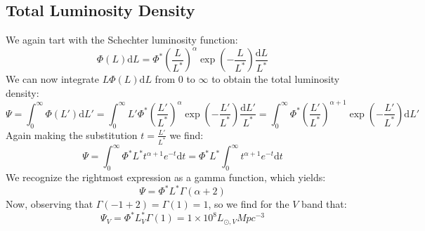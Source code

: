 \subsection{Total Luminosity Density}
We again tart with the Schechter luminosity function:
\begin{equation}
    \Phi(L) \mathrm d L = \Phi^*\left(\frac{L}{L^*}\right)^\alpha\exp(-\frac{L}{L^*})\frac{\mathrm d L}{L^*}
\end{equation}
We can now integrate $L \Phi(L)\mathrm d L$ from $0$ to $\infty$ to obtain the total luminosity density:
\begin{equation}
    \Psi = \int_0^\infty \Phi(L') \mathrm d L' = \int_0^\infty L'\Phi^*\left(\frac{L'}{L^*}\right)^{\alpha}\exp(-\frac{L'}{L^*})\frac{\mathrm d L'}{L^*} = \int_0^\infty \Phi^*\left(\frac{L'}{L^*}\right)^{\alpha+1}\exp(-\frac{L'}{L^*})\mathrm d L'
\end{equation}
Again making the substitution $t = \frac{L'}{L^*}$ we find:
\begin{equation}
    \Psi = \int_0^\infty \Phi^*L^* t^{\alpha+1} e^{-t}\mathrm d t = \Phi^*L^*\int_0^\infty t^{\alpha + 1}e^{-t}\mathrm d t
\end{equation}
We recognize the rightmost expression as a gamma function, which yields:
\begin{equation}
    \boxed{\Psi = \Phi^*L^*\Gamma(\alpha + 2)}
\end{equation}
Now, observing that $\Gamma(-1 + 2) = \Gamma(1) = 1$, so we find for the $V$ band that:
\begin{equation}
    \boxed{\Psi_V = \Phi^*L^*_V\Gamma(1) = 1 \times 10^8 \si{L_{\odot, V} Mpc^{-3}}}
\end{equation}


